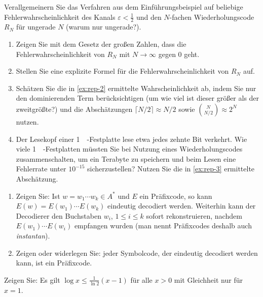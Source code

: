 \documentclass[german]{mhexsheet}
\begin{document}
\maketitle

 
\begin{exercise}[title=Wiederholungscodes]
  Verallgemeinern Sie das Verfahren aus dem Einführungsbeispiel auf beliebige Fehlerwahrscheinlichkeit des Kanals $ε<\frac12$ und den $N$-fachen Wiederholungscode $R_N$ für ungerade $N$ (warum nur ungerade?).
  \begin{enumerate}
    \item Zeigen Sie mit dem Gesetz der großen Zahlen, dass die Fehlerwahrscheinlichkeit von $R_N$ mit $N→∞$ gegen $0$ geht.
    \item Stellen Sie eine explizite Formel für die Fehlerwahrscheinlichkeit von $R_N$ auf.\label{ex:rep-2}
    \item Schätzen Sie die in \cref{ex:rep-2} ermittelte Wahrscheinlichkeit ab, indem Sie nur den dominierenden Term berücksichtigen (um wie viel ist dieser größer als der zweitgrößte?) und die Abschätzungen $⌈N/2⌉≈N/2$ sowie $\binom N{N/2} ≈ 2^N$  nutzen. \label{ex:rep-3}
    \item Der Lesekopf einer \SI{1}{\tera\byte}-Festplatte lese etwa jedes zehnte Bit verkehrt. Wie viele \SI{1}{\tera\byte}-Festplatten müssten Sie bei Nutzung eines Wiederholungscodes zusammenschalten, um ein Terabyte zu speichern und beim Lesen eine Fehlerrate unter $10^{-15}$ sicherzustellen? Nutzen Sie die in \cref{ex:rep-3} ermittelte Abschätzung.
  \end{enumerate}
\end{exercise}

\begin{exercise}
  \begin{enumerate}
    \item Zeigen Sie: Ist $w = w_1\dotsm w_k ∈ A^*$ und $E$ ein Präfixcode, so kann $E(w) = E(w_1)\dotsm E(w_k)$ eindeutig decodiert werden. Weiterhin kann der Decodierer den Buchstaben $w_i$, $1 ≤ i ≤ k$ sofort rekonstruieren, nachdem $E(w_1)\dotsm E(w_i)$ empfangen wurden (man nennt Präfixcodes deshalb auch \emph{instantan}).
    \item Zeigen oder widerlegen Sie: jeder Symbolcode, der eindeutig decodiert werden kann, ist ein Präfixcode.
  \end{enumerate}
\end{exercise}


\begin{exercise}[title=Lemma 5.18]
  Zeigen Sie: Es gilt $\log x ≤ \frac1{\ln 2}(x-1)$ für alle $x > 0$ mit Gleichheit nur für $x=1$.
\end{exercise}
 
\end{document}
